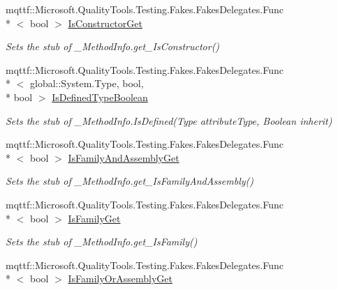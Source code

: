 \begin{DoxyCompactItemize}
mqttf\-::\-Microsoft.\-Quality\-Tools.\-Testing.\-Fakes.\-Fakes\-Delegates.\-Func\\*
$<$ bool $>$ \hyperlink{class_system_1_1_runtime_1_1_interop_services_1_1_fakes_1_1_stub___method_info_ac3f0cd47bc9e2b557ff2eb2b0d6ba901}{Is\-Constructor\-Get}
\begin{DoxyCompactList}\small\item\em Sets the stub of \-\_\-\-Method\-Info.\-get\-\_\-\-Is\-Constructor()\end{DoxyCompactList}\item 
mqttf\-::\-Microsoft.\-Quality\-Tools.\-Testing.\-Fakes.\-Fakes\-Delegates.\-Func\\*
$<$ global\-::\-System.\-Type, bool, \\*
bool $>$ \hyperlink{class_system_1_1_runtime_1_1_interop_services_1_1_fakes_1_1_stub___method_info_a5786b27e7581948812a1cbafea861a32}{Is\-Defined\-Type\-Boolean}
\begin{DoxyCompactList}\small\item\em Sets the stub of \-\_\-\-Method\-Info.\-Is\-Defined(\-Type attribute\-Type, Boolean inherit)\end{DoxyCompactList}\item 
mqttf\-::\-Microsoft.\-Quality\-Tools.\-Testing.\-Fakes.\-Fakes\-Delegates.\-Func\\*
$<$ bool $>$ \hyperlink{class_system_1_1_runtime_1_1_interop_services_1_1_fakes_1_1_stub___method_info_a595e67b56b26bd39d2da0344130cba43}{Is\-Family\-And\-Assembly\-Get}
\begin{DoxyCompactList}\small\item\em Sets the stub of \-\_\-\-Method\-Info.\-get\-\_\-\-Is\-Family\-And\-Assembly()\end{DoxyCompactList}\item 
mqttf\-::\-Microsoft.\-Quality\-Tools.\-Testing.\-Fakes.\-Fakes\-Delegates.\-Func\\*
$<$ bool $>$ \hyperlink{class_system_1_1_runtime_1_1_interop_services_1_1_fakes_1_1_stub___method_info_a22bed28cb3e18441b6bdcdbfa12c15c1}{Is\-Family\-Get}
\begin{DoxyCompactList}\small\item\em Sets the stub of \-\_\-\-Method\-Info.\-get\-\_\-\-Is\-Family()\end{DoxyCompactList}\item 
mqttf\-::\-Microsoft.\-Quality\-Tools.\-Testing.\-Fakes.\-Fakes\-Delegates.\-Func\\*
$<$ bool $>$ \hyperlink{class_system_1_1_runtime_1_1_interop_services_1_1_fakes_1_1_stub___method_info_a873343aecd8dc0f40411f7486ff40f5f}{Is\-Family\-Or\-Assembly\-Get}

\end{DoxyCompactItemize}
